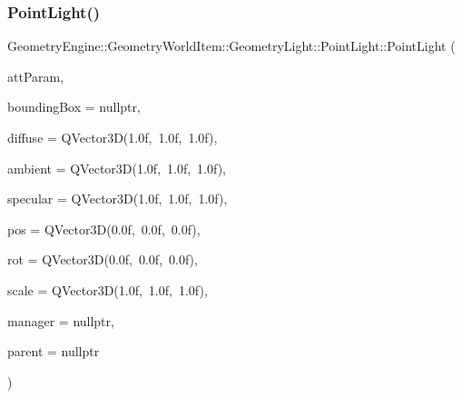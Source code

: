 \subsubsection{\texorpdfstring{PointLight()}{PointLight()}\hspace{0.1cm}{\footnotesize\ttfamily [1/2]}}
{\footnotesize\ttfamily Geometry\+Engine\+::\+Geometry\+World\+Item\+::\+Geometry\+Light\+::\+Point\+Light\+::\+Point\+Light (\begin{DoxyParamCaption}\item[{const Q\+Vector3D \&}]{att\+Param,  }\item[{\mbox{\hyperlink{class_geometry_engine_1_1_geometry_world_item_1_1_geometry_item_1_1_geometry_item}{Geometry\+Item\+::\+Geometry\+Item}} $\ast$}]{bounding\+Box = {\ttfamily nullptr},  }\item[{const Q\+Vector3D \&}]{diffuse = {\ttfamily QVector3D(1.0f,~1.0f,~1.0f)},  }\item[{const Q\+Vector3D \&}]{ambient = {\ttfamily QVector3D(1.0f,~1.0f,~1.0f)},  }\item[{const Q\+Vector3D \&}]{specular = {\ttfamily QVector3D(1.0f,~1.0f,~1.0f)},  }\item[{const Q\+Vector3D \&}]{pos = {\ttfamily QVector3D(0.0f,~0.0f,~0.0f)},  }\item[{const Q\+Vector3D \&}]{rot = {\ttfamily QVector3D(0.0f,~0.0f,~0.0f)},  }\item[{const Q\+Vector3D \&}]{scale = {\ttfamily QVector3D(1.0f,~1.0f,~1.0f)},  }\item[{const \mbox{\hyperlink{class_geometry_engine_1_1_light_utils_1_1_light_component_manager}{Light\+Utils\+::\+Light\+Component\+Manager}} $\ast$const}]{manager = {\ttfamily nullptr},  }\item[{\mbox{\hyperlink{class_geometry_engine_1_1_geometry_world_item_1_1_world_item}{World\+Item}} $\ast$}]{parent = {\ttfamily nullptr} }\end{DoxyParamCaption})}

